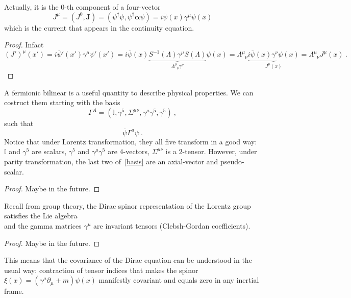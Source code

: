     Actually, it is the $0$-th component of a four-vector 
    \begin{equation*}
        J^\mu = (J^0, \mathbf J) = (\psi^\dagger \psi, \psi^\dagger \boldsymbol \alpha \psi) = i \overline \psi (x) \gamma^\mu \psi (x)
    \end{equation*}
    which is the current that appears in the continuity equation.
    \begin{proof}
        Infact 
        \begin{equation*}
            (J')^\mu (x') = i \overline \psi' (x') \gamma^\mu \psi' (x') = i \overline \psi (x) \underbrace{S^{-1} (\Lambda) \gamma^\mu S(\Lambda)}_{\Lambda^\mu_{\phantom \mu \nu} \gamma^\nu} \psi (x) = \Lambda^\mu_{\phantom \mu \nu} \underbrace{i \overline \psi (x) \gamma^\nu \psi (x)}_{J^\mu (x)} = \Lambda^\mu_{\phantom \mu \nu} J^\mu (x) ~.
        \end{equation*}
    \end{proof}

    A fermionic bilinear is a useful quantity to describe physical properties. We can costruct them starting with the basis 
    \begin{equation}\label{basis}
        \Gamma^A = (\mathbb I, \gamma^5, \Sigma^{\mu\nu}, \gamma^\mu \gamma^5, \gamma^5) ~,
    \end{equation} such that
    \begin{equation*}
        \overline \psi \Gamma^a \psi ~.
    \end{equation*}
    Notice that under Lorentz transformation, they all five transform in a good way: $\mathbb I$ and $\gamma^5$ are scalars, $\gamma^5$ and $\gamma^\mu \gamma^5$ are $4$-vectors, $\Sigma^{\mu\nu}$ is a $2$-tensor. However, under parity transformation, the last two of~\eqref{basis} are an axial-vector and pseudo-scalar.
    \begin{proof}
        Maybe in the future.
    \end{proof}

    Recall from group theory, the Dirac spinor representation of the Lorentz group satisfies the Lie algebra 
    \begin{equation*}
        [\Sigma, \Sigma] 
    \end{equation*}
    and the gamma matrices $\gamma^\mu$ are invariant tensors (Clebsh-Gordan coefficients). 
    \begin{proof}
        Maybe in the future.
    \end{proof}
    This means that the covariance of the Dirac equation can be understood in the usual way: contraction of tensor indices that makes the spinor $\xi (x) = (\gamma^\mu \partial_\mu + m) \psi(x)$ manifestly covariant and equals zero in any inertial frame.

